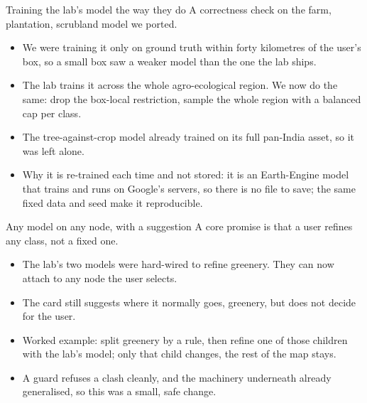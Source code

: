\documentclass[aspectratio=169]{beamer}
\begin{document}
\begin{frame}{Training the lab's model the way they do}
A correctness check on the farm, plantation, scrubland model we ported.
\begin{itemize}\small
  \item We were training it only on ground truth within forty kilometres of the user's box, so a small
  box saw a weaker model than the one the lab ships.
  \item The lab trains it across the whole agro-ecological region. We now do the same: drop the
  box-local restriction, sample the whole region with a balanced cap per class.
  \item The tree-against-crop model already trained on its full pan-India asset, so it was left alone.
  \item Why it is re-trained each time and not stored: it is an Earth-Engine model that trains and runs
  on Google's servers, so there is no file to save; the same fixed data and seed make it reproducible.
\end{itemize}
\end{frame}

\begin{frame}{Any model on any node, with a suggestion}
A core promise is that a user refines any class, not a fixed one.
\begin{itemize}\small
  \item The lab's two models were hard-wired to refine greenery. They can now attach to any node the
  user selects.
  \item The card still suggests where it normally goes, greenery, but does not decide for the user.
  \item Worked example: split greenery by a rule, then refine one of those children with the lab's
  model; only that child changes, the rest of the map stays.
  \item A guard refuses a clash cleanly, and the machinery underneath already generalised, so this was a
  small, safe change.
\end{itemize}
\end{frame}
\end{document}

